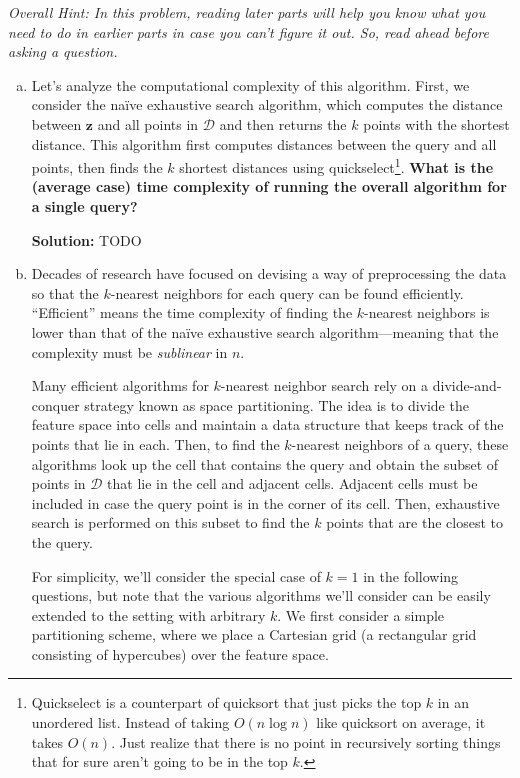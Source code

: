 \documentclass{article}
\renewcommand{\vec}[1]{\boldsymbol{\mathbf{#1}}}
\newenvironment{solution}{\color{blue} \smallskip \textbf{Solution:}}{}
\begin{document}
{\em Overall Hint: In this problem, reading later parts will help you know what you need to do in earlier parts in case you can't figure it out. So, read ahead before asking a question.}

\begin{enumerate}[(a)]
    \item 
    Let's analyze the computational complexity of this algorithm. 
    First, we consider the na\"{i}ve exhaustive search algorithm, which computes the distance between $\vec{z}$ and all points in $\mathcal{D}$ and then returns the $k$ points with the shortest distance. 
    This algorithm first computes distances between the query and all points, then finds the $k$ shortest distances using quickselect\footnote{Quickselect is a counterpart of quicksort that just picks the top $k$ in an unordered list. Instead of taking $O(n \log n)$ like quicksort on average, it takes $O(n)$. Just realize that there is no point in recursively sorting things that for sure aren't going to be in the top $k$.}.
    {\bf What is the (average case) time complexity of running the overall algorithm for a single query?} 
    
    \begin{solution}
        TODO
    \end{solution}

    \newpage
    \item 
    Decades of research have focused on devising a way of preprocessing the data so that the $k$-nearest neighbors for each query can be found efficiently. 
    ``Efficient'' means the time complexity of finding the $k$-nearest neighbors is lower than that of the na\"{i}ve exhaustive search algorithm---meaning that the complexity must be \emph{sublinear} in $n$.
    
    Many efficient algorithms for $k$-nearest neighbor search rely on a divide-and-conquer strategy known as space partitioning. 
    The idea is to divide the feature space into cells and maintain a data structure that keeps track of the points that lie in each. 
    Then, to find the $k$-nearest neighbors of a query, these algorithms look up the cell that contains the query and obtain the subset of points in $\mathcal{D}$ that lie in the cell and adjacent cells. 
    Adjacent cells must be included in case the query point is in the corner of its cell. 
    Then, exhaustive search is performed on this subset to find the $k$ points that are the closest to the query.
    
    For simplicity, we'll consider the special case of $k = 1$ in the following questions, but note that the various algorithms we'll consider can be easily extended to the setting with arbitrary $k$. 
    We first consider a simple partitioning scheme, where we place a Cartesian grid (a rectangular grid consisting of hypercubes) over the feature space.
    

\end{enumerate}
\end{document}

